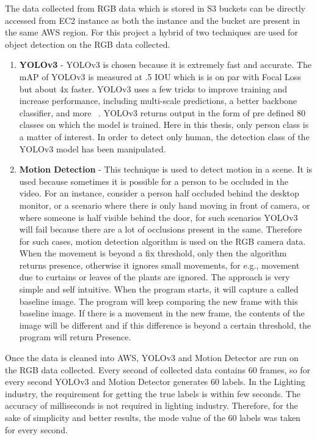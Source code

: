 The data collected from RGB data which is stored in S3 buckets can be directly accessed from EC2 instance as both the instance and the bucket are present in the same AWS region.  For this project a hybrid of  two techniques are used for object detection on the RGB data collected. 
\begin{enumerate}
    \item \textbf{YOLOv3} - YOLOv3 is chosen because it is extremely fast and accurate. The mAP of YOLOv3 is measured at .5 IOU  which is is on par with Focal Loss but about 4x faster. YOLOv3 uses a few tricks to improve training and increase performance, including multi-scale predictions, a better backbone classifier, and more ~\cite{yolo_time}. YOLOv3 returns output in the form of pre defined 80 classes on which the model is trained. Here in this thesis, only person class is a matter of interest. In order to detect only human, the detection class of the YOLOv3 model has been manipulated.
    \item \textbf{Motion Detection} - This technique is used to detect motion in a scene. It is used because sometimes it is possible for a person to be occluded in the video. For an instance, consider a person half occluded behind the desktop monitor, or a scenario where there is only hand moving in front of camera, or where someone is half visible behind the door, for such scenarios YOLOv3 will fail because there are a lot of occlusions present in the same. Therefore for such cases, motion detection algorithm is used on the RGB camera data. When the movement is beyond a fix threshold, only then the algorithm returns presence, otherwise it ignores small movements, for e.g., movement due to curtains or leaves of the plants are ignored. The approach is very simple and self intuitive. When the program starts, it will capture a called baseline image. The program will keep comparing the new frame with this baseline image. If there is a movement in the new frame, the contents of the image will be different and if this difference is beyond a certain threshold,  the program will return Presence.
\end{enumerate}

Once the data is cleaned into AWS, YOLOv3 and  Motion Detector are run on the RGB data collected. Every second of collected data contains 60 frames, so for every second YOLOv3 and Motion Detector generates 60 labels. In the Lighting industry, the requirement for getting the true labels is within few seconds. The accuracy of milliseconds is not required in lighting industry. Therefore, for the sake of simplicity and better results, the mode value of the 60 labels was taken for every second. 

